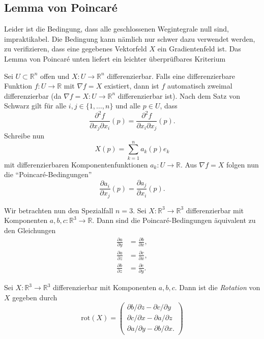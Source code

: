 \documentclass[../main.tex]{subfiles}
\begin{document}
\subsection*{Lemma von Poincaré}

Leider ist die Bedingung, dass alle geschlossenen Wegintegrale
null sind, impraktikabel.
Die Bedingung kann nämlich nur schwer dazu verwendet werden,
zu verifizieren, dass eine gegebenes Vektorfeld $X$ 
ein Gradientenfeld ist.
Das Lemma von Poincaré unten liefert ein leichter überprüfbares
Kriterium

Sei $U \subset \mathbb{R}^n$ offen
und $X \colon U \to \mathbb{R}^n$ differenzierbar.
Falls eine differenzierbare Funktion
$f \colon U \to \mathbb{R}$ mit $\nabla f = X$ existiert,
dann ist $f$ automatisch zweimal differenzierbar
(da $\nabla f = X \colon U \to \mathbb{R}^n$ differenzierbar ist).
Nach dem Satz von Schwarz gilt für alle
$i, j \in \{1, \dots, n\}$ und alle $p \in U$, dass
\[
  \frac{\partial^2 f}{\partial x_j \partial x_i}(p) =
  \frac{\partial^2 f}{\partial x_i \partial x_j}(p).
\]
Schreibe nun
\[
  X(p) = \sum_{k=1}^{n} a_k(p) e_k
\]
mit differenzierbaren Komponentenfunktionen $a_k \colon U \to \mathbb{R}$.
Aus $\nabla f = X$ folgen nun die ``Poincaré-Bedingungen''
\[
  \frac{\partial a_i}{\partial x_j}(p) = \frac{\partial a_j}{\partial x_i}(p).
\]

Wir betrachten nun den Spezialfall $n = 3$.
Sei $X \colon \mathbb{R}^3 \to \mathbb{R}^3$ 
differenzierbar mit Komponenten $a, b, c \colon \mathbb{R}^3 \to \mathbb{R}$.
Dann sind die Poincaré-Bedingungen äquivalent zu den Gleichungen
\begin{align*}
  \frac{\partial a}{\partial y} &= \frac{\partial b}{\partial x}, \\
  \frac{\partial a}{\partial z} &= \frac{\partial c}{\partial x}, \\
  \frac{\partial b}{\partial z} &= \frac{\partial c}{\partial y}.
\end{align*}

\begin{definition}
  Sei $X \colon \mathbb{R}^3 \to \mathbb{R}^3$ differenzierbar
  mit Komponenten $a, b, c$.
  Dann ist die \emph{Rotation} von $X$ gegeben durch
  \[
    \text{rot}(X) =
    \begin{pmatrix}
      {\partial b}/{\partial z} - {\partial c}/{\partial y} \\
      {\partial c}/{\partial x} - {\partial a}/{\partial z} \\
      {\partial a}/{\partial y} - {\partial b}/{\partial x}.
    \end{pmatrix}
  \]
\end{definition}
\end{document}
